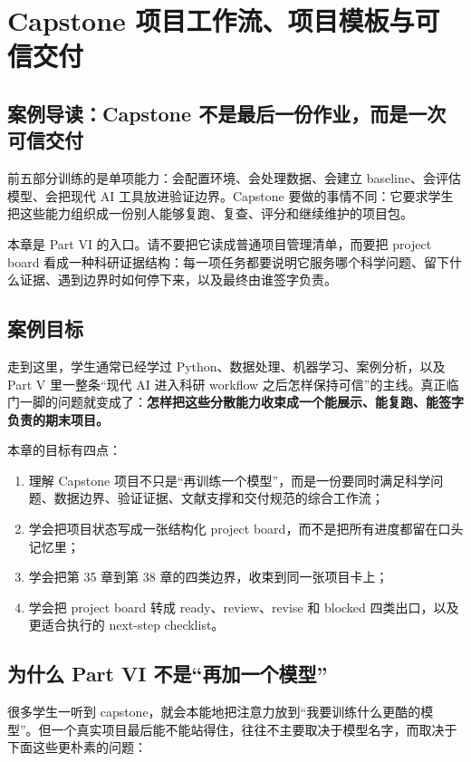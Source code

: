 \chapter{Capstone 项目工作流、项目模板与可信交付}

\section{案例导读：Capstone 不是最后一份作业，而是一次可信交付}

前五部分训练的是单项能力：会配置环境、会处理数据、会建立 baseline、会评估模型、会把现代 AI 工具放进验证边界。Capstone 要做的事情不同：它要求学生把这些能力组织成一份别人能够复跑、复查、评分和继续维护的项目包。

本章是 Part VI 的入口。请不要把它读成普通项目管理清单，而要把 project board 看成一种科研证据结构：每一项任务都要说明它服务哪个科学问题、留下什么证据、遇到边界时如何停下来，以及最终由谁签字负责。

\section{案例目标}

走到这里，学生通常已经学过 Python、数据处理、机器学习、案例分析，以及 Part V 里一整条“现代 AI 进入科研 workflow 之后怎样保持可信”的主线。真正临门一脚的问题就变成了：\textbf{怎样把这些分散能力收束成一个能展示、能复跑、能签字负责的期末项目。}

本章的目标有四点：

\begin{enumerate}
    \item 理解 Capstone 项目不只是“再训练一个模型”，而是一份要同时满足科学问题、数据边界、验证证据、文献支撑和交付规范的综合工作流；
    \item 学会把项目状态写成一张结构化 project board，而不是把所有进度都留在口头记忆里；
    \item 学会把第 35 章到第 38 章的四类边界，收束到同一张项目卡上；
    \item 学会把 project board 转成 ready、review、revise 和 blocked 四类出口，以及更适合执行的 next-step checklist。
\end{enumerate}

\section{为什么 Part VI 不是“再加一个模型”}

很多学生一听到 capstone，就会本能地把注意力放到“我要训练什么更酷的模型”。但一个真实项目最后能不能站得住，往往不主要取决于模型名字，而取决于下面这些更朴素的问题：

